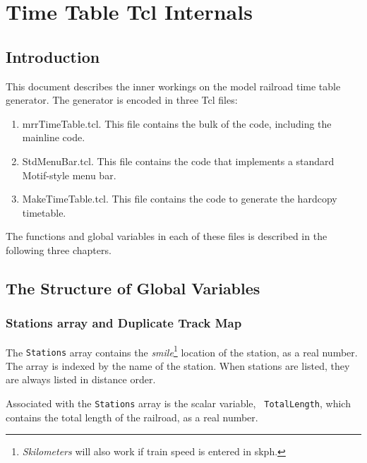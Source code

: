 \part{Time Table Tcl Internals}
\chapter{Introduction}
\label{chapt:Introduction}

This document describes the inner workings on the model railroad time
table generator.  The generator is encoded in three Tcl files:

\begin{enumerate}

\item mrrTimeTable.tcl.  This file contains the bulk of the code,
including the mainline code.

\item StdMenuBar.tcl.  This file contains the code that implements a
standard Motif-style menu bar.

\item MakeTimeTable.tcl.  This file contains the code to generate the
hardcopy timetable.

\end{enumerate}

The functions and global variables in each of these files is described
in the following three chapters.

%


\chapter{The Structure of Global Variables}
\label{chapt:GlobalStructure}
%
\section{Stations array and Duplicate Track Map}

The {\tt Stations} array contains the {\em smile}\footnote{{\em
Skilometers} will also work if train speed is entered in skph.} location
of the station, as a real number.  The array is indexed by the name of
the station.  When stations are listed, they are always listed in
distance order.

Associated with the {\tt Stations} array is the scalar variable, {\tt
TotalLength}, which contains the total length
of the railroad, as a real number.  

